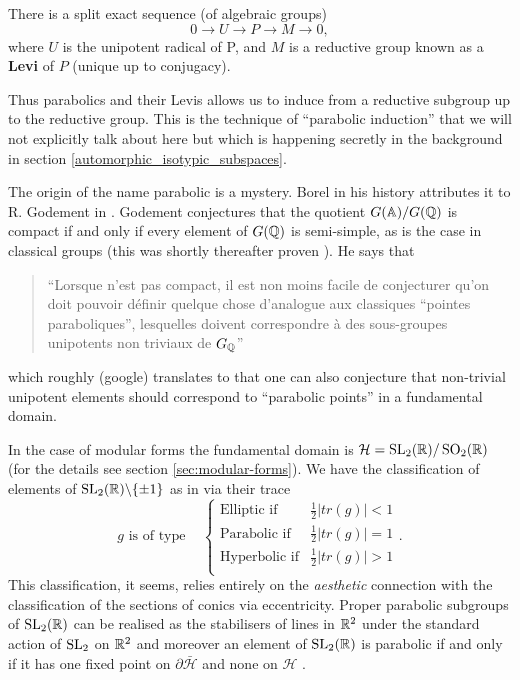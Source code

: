\begin{Lemma}
    There is a split exact sequence (of algebraic groups)
    \[0 \to U \to P \to M \to 0,\]
    where \(U\) is the unipotent radical of P, and \(M\) is a reductive group known as a \textbf{Levi} of \(P\) (unique up to conjugacy).
\end{Lemma}

Thus parabolics and their Levis allows us to induce from a reductive subgroup up to the reductive group. This is the technique of ``parabolic induction'' \cite[Thm. 10]{bernsteinREPRESENTATIONSPADICGROUPS1992} that we will not explicitly talk about here but which is happening secretly in the background in section \ref{automorphic_isotypic_subspaces}.

\begin{Remark}
    The origin of the name parabolic is a mystery. Borel in his history \cite[VI.\S 2]{borelEssaysHistoryLie2001} attributes it to R. Godement in \cite{SB_1960-1961__6__11_0}. Godement conjectures that the quotient \(G(\A) / G(\Q)\) is compact if and only if every element of \(G(\Q)\) is semi-simple, as is the case in classical groups (this was shortly thereafter proven \cite{mostowCompactnessArithmeticallyDefined1962}). He says that 
    \begin{quote}
        ``Lorsque n'est pas compact, il est non moins facile de conjecturer qu’on doit pouvoir définir quelque chose d’analogue aux classiques ``pointes paraboliques'', lesquelles doivent correspondre à des  sous-groupes unipotents non triviaux de \(G_\Q\)''
    \end{quote}
    which roughly (google) translates to that one can also conjecture that non-trivial unipotent elements should correspond to ``parabolic points'' in a fundamental domain.

    In the case of modular forms the fundamental domain is \(\mathcal{H} = \SL_2(\R)/\SO_2(\R)\) (for the details see section \ref{sec:modular-forms}). We have the classification of elements of  \(\SL_2(\R) \backslash\{\pm 1\}\) as in \cite[3.5]{borelAutomorphicFormsSL21997} via their trace
    \[g\text{ is of type } \;\;\; 
    \begin{cases}
        \text{Elliptic if} & \frac{1}{2}|tr(g)| < 1 \\
        \text{Parabolic if} & \frac{1}{2}|tr(g)| = 1 \\
        \text{Hyperbolic if} & \frac{1}{2}|tr(g)| > 1 \\
    \end{cases}
    .\]
    This classification, it seems, relies entirely on the \textit{aesthetic} connection with the classification of the sections of conics via eccentricity. Proper parabolic subgroups of \(\SL_2(\R)\) can be realised as the stabilisers of lines in \(\R^2\) under the standard action of \(\operatorname{SL}_2\) on \(\R^2\) \cite[2.6]{borelAutomorphicFormsSL21997} and moreover an element of \(\SL_2(\R)\) is parabolic if and only if it has one fixed point on \(\partial\bar{\mathcal{H}}\) and none on \(\mathcal{H}\) \cite[3.5]{borelAutomorphicFormsSL21997}.
    

\end{Remark}
